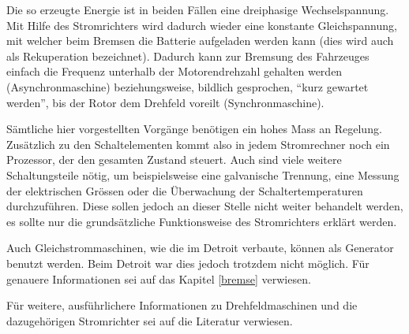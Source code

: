 Die so erzeugte Energie ist in beiden Fällen eine dreiphasige Wechselspannung. Mit Hilfe des Stromrichters wird dadurch wieder eine konstante Gleichspannung, mit welcher beim Bremsen die Batterie aufgeladen werden kann (dies wird auch als Rekuperation bezeichnet). Dadurch kann zur Bremsung des Fahrzeuges einfach die Frequenz unterhalb der Motorendrehzahl gehalten werden (Asynchronmaschine) beziehungsweise, bildlich gesprochen, "`kurz gewartet werden"', bis der Rotor dem Drehfeld voreilt (Synchronmaschine).

Sämtliche hier vorgestellten Vorgänge benötigen ein hohes Mass an Regelung. Zusätzlich zu den Schaltelementen kommt also in jedem Stromrechner noch ein Prozessor, der den gesamten Zustand steuert. Auch sind viele weitere Schaltungsteile nötig, um beispielsweise eine galvanische Trennung, eine Messung der elektrischen Grössen oder die Überwachung der Schaltertemperaturen durchzuführen. Diese sollen jedoch an dieser Stelle nicht weiter behandelt werden, es sollte nur die grundsätzliche Funktionsweise des Stromrichters erklärt werden.

Auch Gleichstrommaschinen, wie die im Detroit verbaute, können als Generator benutzt werden. Beim Detroit war dies jedoch trotzdem nicht möglich. Für genauere Informationen sei auf das Kapitel \ref{bremse} verwiesen.

Für weitere, ausführlichere Informationen zu Drehfeldmaschinen und die dazugehörigen Stromrichter sei auf die Literatur verwiesen. 

\newpage
